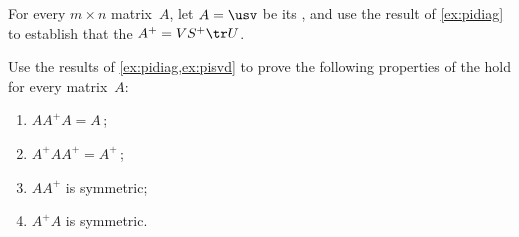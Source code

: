 \begin{exercise} \label{ex:pisvd} 
For every \(m\times n\) matrix~\(A\), let \(A=\usv\) be its \svd, and use the result of \cref{ex:pidiag} to establish that the  \(A^+=VS^+\tr U\).
\end{exercise}



\begin{exercise}  
Use the results of \cref{ex:pidiag,ex:pisvd} to prove the following properties of the  hold for every matrix~\(A\):
\begin{enumerate}
\item \(AA^+A=A\)\,;
\item \(A^+AA^+=A^+\)\,;
\item \(AA^+\) is symmetric;
\item \(A^+A\) is symmetric.
\end{enumerate}
\end{exercise}







